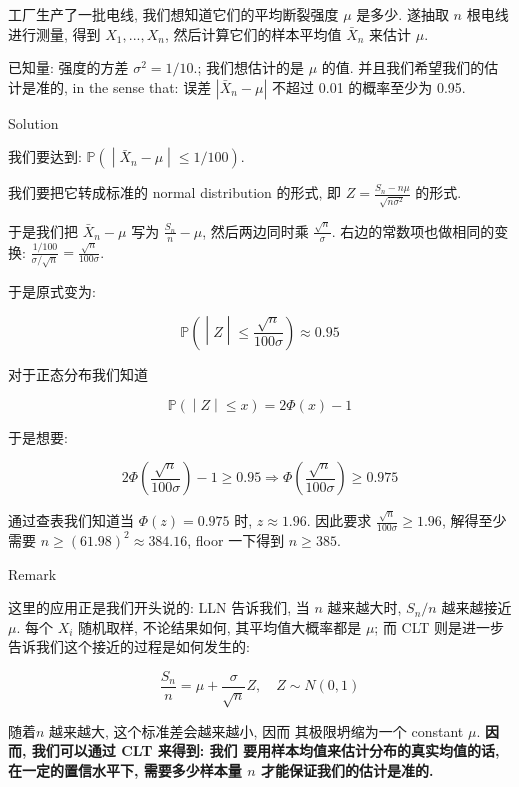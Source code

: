 \documentclass{qlnotes-export}
\begin{document}
\begin{example}[(样本量需求的计算)]

工厂生产了一批电线, 我们想知道它们的平均断裂强度 \(\mu\) 是多少. 遂抽取 \(n\) 根电线进行测量, 得到 \(X_{1},...,X_{n}\), 然后计算它们的样本平均值 \({\bar{X}}_{n}\) 来估计 \(\mu\).

已知量: 强度的方差 \(\sigma^{2} = 1/10\).; 我们想估计的是 \(\mu\) 的值. 并且我们希望我们的估计是准的, in the sense that: 误差 \(|{\bar{X}}_{n} - \mu|\) 不超过 0.01 的概率至少为 0.95.

\begin{qlsolution}{Solution}

我们要达到: \(\left. {\mathbb{P}}( \middle| {\bar{X}}_{n} - \mu \middle| \leq 1/100) \right.\).

我们要把它转成标准的 normal distribution 的形式, 即 \(Z = \frac{S_{n} - n\mu}{\sqrt{n\sigma^{2}}}\) 的形式.

于是我们把 \({\bar{X}}_{n} - \mu\) 写为 \(\frac{S_{n}}{n} - \mu\), 然后两边同时乘 \(\frac{\sqrt{n}}{\sigma}\). 右边的常数项也做相同的变换: \(\frac{1/100}{\sigma/\sqrt{n}} = \frac{\sqrt{n}}{100\sigma}\).

于是原式变为:

\[\left. {\mathbb{P}}( \middle| Z \middle| \leq \frac{\sqrt{n}}{100\sigma}) \approx 0.95 \right.\]

对于正态分布我们知道

\[\left. {\mathbb{P}}( \middle| Z \middle| \leq x) = 2\Phi(x) - 1 \right.\]

于是想要:

\[2\Phi\left( \frac{\sqrt{n}}{100\sigma} \right) - 1 \geq 0.95\Longrightarrow\Phi\left( \frac{\sqrt{n}}{100\sigma} \right) \geq 0.975\]

通过查表我们知道当 \(\Phi(z) = 0.975\) 时, \(z \approx 1.96\). 因此要求 \(\frac{\sqrt{n}}{100\sigma} \geq 1.96\), 解得至少需要 \(n \geq (61.98)^{2} \approx 384.16\), floor 一下得到 \(n \geq 385\).

\end{qlsolution}

\begin{qlremark}{Remark}

这里的应用正是我们开头说的: LLN 告诉我们, 当 \(n\) 越来越大时, \(S_{n}/n\) 越来越接近 \(\mu\). 每个 \(X_{i}\) 随机取样, 不论结果如何, 其平均值大概率都是 \(\mu\); 而 CLT 则是进一步告诉我们这个接近的过程是如何发生的:

\[\frac{S_{n}}{n} = \mu + \frac{\sigma}{\sqrt{n}}Z,\quad Z \sim N(0,1)\]

随着\(n\) 越来越大, 这个标准差会越来越小, 因而 其极限坍缩为一个 constant \(\mu\). \textbf{因而, 我们可以通过 CLT 来得到: 我们 要用样本均值来估计分布的真实均值的话, 在一定的置信水平下, 需要多少样本量 \(n\) 才能保证我们的估计是准的.}

\end{qlremark}

\end{example}
\end{document}
